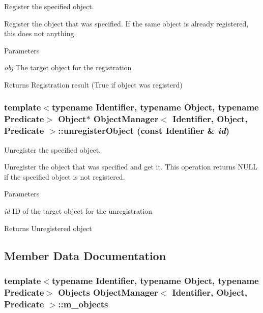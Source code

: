 Register the specified object. 

Register the object that was specified. If the same object is already registered, this does not anything.


\begin{DoxyParams}{Parameters}
\item[{\em obj}]The target object for the registration\end{DoxyParams}
\begin{DoxyReturn}{Returns}
Registration result (True if object was registerd) 
\end{DoxyReturn}
\subsubsection[{unregisterObject}]{\setlength{\rightskip}{0pt plus 5cm}template$<$typename Identifier, typename Object, typename Predicate$>$ Object$\ast$ {\bf ObjectManager}$<$ Identifier, Object, Predicate $>$::unregisterObject (const Identifier \& {\em id})\hspace{0.3cm}{\ttfamily  [inline]}}\label{classObjectManager_a082eb0fcf17aeb833a8e0d80c077229a}


Unregister the specified object. 

Unregister the object that was specified and get it. This operation returns NULL if the specified object is not registered.


\begin{DoxyParams}{Parameters}
\item[{\em id}]ID of the target object for the unregistration\end{DoxyParams}
\begin{DoxyReturn}{Returns}
Unregistered object 
\end{DoxyReturn}


\subsection{Member Data Documentation}
\subsubsection[{m\_\-objects}]{\setlength{\rightskip}{0pt plus 5cm}template$<$typename Identifier, typename Object, typename Predicate$>$ {\bf Objects} {\bf ObjectManager}$<$ Identifier, Object, Predicate $>$::{\bf m\_\-objects}\hspace{0.3cm}{\ttfamily  [protected]}}\label{classObjectManager_ae0c7be9ecce476a588ffb884d663b3e8}


